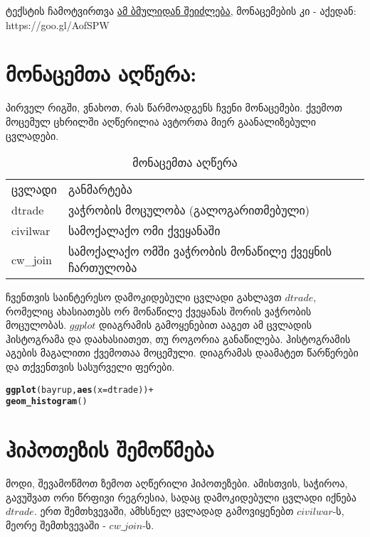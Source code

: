 \documentclass{article}\usepackage[]{graphicx}\usepackage[]{color}
\makeatletter
\newcommand{\hlopt}[1]{\textcolor[rgb]{0,0,0}{#1}}%
\newcommand{\hlstd}[1]{\textcolor[rgb]{0.345,0.345,0.345}{#1}}%
\newcommand{\hlkwc}[1]{\textcolor[rgb]{0.333,0.667,0.333}{#1}}%
\newcommand{\hlkwd}[1]{\textcolor[rgb]{0.737,0.353,0.396}{\textbf{#1}}}%
\newenvironment{kframe}{%
 \def\at@end@of@kframe{}%
 \ifinner\ifhmode%
  \def\at@end@of@kframe{\end{minipage}}%
  \begin{minipage}{\columnwidth}%
 \fi\fi%
 \def\FrameCommand##1{\hskip\@totalleftmargin \hskip-\fboxsep
 \colorbox{shadecolor}{##1}\hskip-\fboxsep
     \hskip-\linewidth \hskip-\@totalleftmargin \hskip\columnwidth}%
 \MakeFramed {\advance\hsize-\width
   \@totalleftmargin\z@ \linewidth\hsize
   \@setminipage}}%
 {\par\unskip\endMakeFramed%
 \at@end@of@kframe}
\newenvironment{knitrout}{}{} %
\makeatother
\begin{document}
ტექსტის ჩამოტვირთვა \href{https://www.dropbox.com/s/xsoyht80qkt0jmo/bayer2004.pdf?dl=0}{ამ ბმულიდან შეიძლება}, მონაცემების კი - აქედან: https://goo.gl/AofSPW

\section*{მონაცემთა აღწერა:}

პირველ რიგში, ვნახოთ, რას წარმოადგენს ჩვენი მონაცემები. ქვემოთ მოცემულ ცხრილში აღწერილია ავტორთა მიერ გაანალიზებული ცვლადები.

\begin{table}[]
\centering
\caption{მონაცემთა აღწერა}
\label{my-label}
\begin{tabular}{ll}
ცვლადი    & განმარტება                                                                      \\
dtrade       & ვაჭრობის მოცულობა (გალოგარითმებული)                                               \\
civilwar    & სამოქალაქო ომი ქვეყანაში                                   \\
cw\_join    & სამოქალაქო ომში ვაჭრობის მონაწილე ქვეყნის ჩართულობა 
\end{tabular}
\end{table}

ჩვენთვის საინტერესო დამოკიდებული ცვლადი გახლავთ $dtrade$, რომელიც ახასიათებს ორ მონაწილე ქვეყანას შორის ვაჭრობის მოცულობას. $ggplot$ დიაგრამის გამოყენებით ააგეთ ამ ცვლადის ჰისტოგრამა და დაახასიათეთ, თუ როგორია განაწილება. ჰისტოგრამის აგების მაგალითი ქვემოთაა მოცემული. დიაგრამას დაამატეთ წარწერები და თქვენთვის სასურველი ფერები.

\begin{knitrout}
\color{fgcolor}\begin{kframe}
\begin{alltt}
\hlkwd{ggplot}\hlstd{(bayrup,} \hlkwd{aes}\hlstd{(}\hlkwc{x}\hlstd{=dtrade))}\hlopt{+}
  \hlkwd{geom_histogram}\hlstd{()}
\end{alltt}
\end{kframe}
\end{knitrout}

\section*{ჰიპოთეზის შემოწმება}

მოდი, შევამოწმოთ ზემოთ აღწერილი ჰიპოთეზები. ამისთვის, საჭიროა, გავუშვათ ორი წრფივი რეგრესია, სადაც დამოკიდებული ცვლადი იქნება $dtrade$. ერთ შემთხვევაში, ამხსნელ ცვლადად გამოვიყენებთ $civilwar$-ს, მეორე შემთხვევაში - $cw\_join$-ს.
\end{document}
